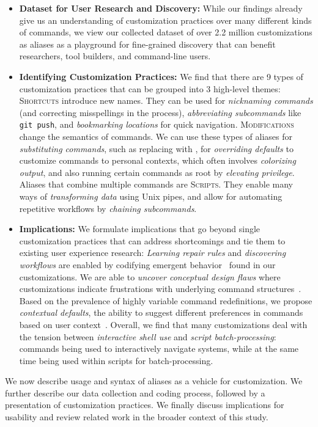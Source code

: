 \begin{itemize}[leftmargin=0.3cm]
	\item \textbf{Dataset for User Research and Discovery:} While our findings already give us an understanding of customization practices over many different kinds of commands, we view our collected dataset of over 2.2 million customizations as aliases as a playground for fine-grained discovery that can benefit researchers, tool builders, and command-line users.

	\item \textbf{Identifying Customization Practices:} We find that there are 9 types of customization practices that can be grouped into 3 high-level themes:
	\textsc{Shortcuts} introduce new names.
	They can be used for \emph{nicknaming commands} (and correcting misspellings in the process),
	\emph{abbreviating subcommands} like \texttt{git push},
	and \emph{bookmarking locations} for quick navigation.
	\textsc{Modifications} change the semantics of commands.
	We can use these types of aliases for \emph{substituting commands}, such as replacing  with ,
	for \emph{overriding defaults} to customize commands to personal contexts, 
	which often involves \emph{colorizing output},
	and also running certain commands as root by \emph{elevating privilege}.
	Aliases that combine multiple commands are \textsc{Scripts}.
	They enable many ways of \emph{transforming data} using Unix pipes, 
	and allow for automating repetitive workflows by \emph{chaining subcommands}.
	
	\item \textbf{Implications: } We formulate implications that go beyond single customization practices that can address shortcomings and tie them to existing user experience research:
	\emph{Learning repair rules} and \emph{discovering workflows} are enabled by codifying emergent behavior~\cite{fast:14} found in our customizations. We are able to \emph{uncover conceptual design flaws} where customizations indicate frustrations with underlying command structures~\cite{perez:13}.
	Based on the prevalence of highly variable command redefinitions, we propose \emph{contextual defaults}, the ability to suggest different preferences in commands based on user context~\cite{stefanidis:11}.
	Overall, we find that many customizations deal with the tension between \emph{interactive shell use} and \emph{script batch-processing}: commands being used to interactively navigate systems, while at the same time being used within scripts for batch-processing.
\end{itemize}

We now describe usage and syntax of aliases as a vehicle for customization. We further describe our data collection and coding process, followed by a presentation of customization practices. We finally discuss implications for usability and review related work in the broader context of this study.